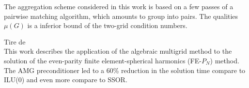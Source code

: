 The aggregation scheme considered in this work is based on a few passes of a
pairwise matching algorithm, which amounts to group into pairs. The qualities
$\mu(G)$ is a inferior bound of the two-grid condition numbers.


Tire de \cite{amg_pn}\\
This work describes the application of the algebraic multigrid method to the
solution of the even-parity finite element-spherical harmonics (FE-$P_N$)
method. The AMG preconditioner led to a 60\% reduction in the solution time
compare to ILU(0) and even more compare to SSOR.
